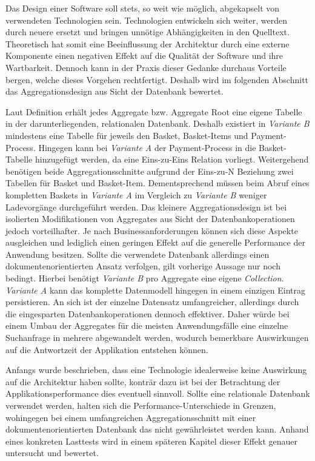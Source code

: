 Das Design einer Software soll stets, so weit wie möglich, abgekapselt von verwendeten Technologien sein. Technologien entwickeln sich weiter, werden durch neuere ersetzt und bringen unnötige Abhängigkeiten in den Quelltext. Theoretisch hat somit eine Beeinflussung der Architektur durch eine externe Komponente einen negativen Effekt auf die Qualität der Software und ihre Wartbarkeit. Dennoch kann in der Praxis dieser Gedanke durchaus Vorteile bergen, welche dieses Vorgehen rechtfertigt. Deshalb wird im folgenden Abschnitt das Aggregationsdesign aus Sicht der Datenbank bewertet.

Laut Definition erhält jedes Aggregate bzw. Aggregate Root eine eigene Tabelle in der darunterliegenden, relationalen Datenbank. Deshalb existiert in \emph{Variante B} mindestens eine Tabelle für jeweils den Basket, Basket-Items und Payment-Process. Hingegen kann bei \emph{Variante A} der Payment-Process in die Basket-Tabelle hinzugefügt werden, da eine Eins-zu-Eins Relation vorliegt. Weitergehend benötigen beide Aggregationsschnitte aufgrund der Eins-zu-N Beziehung zwei Tabellen für Basket und Basket-Item. Dementsprechend müssen beim Abruf eines kompletten Baskets in \emph{Variante A} im Vergleich zu \emph{Variante B} weniger Ladevorgänge durchgeführt werden. Das kleinere Aggregationsdesign ist bei isolierten Modifikationen von Aggregates aus Sicht der Datenbankoperationen jedoch vorteilhafter. Je nach Businessanforderungen können sich diese Aspekte ausgleichen und lediglich einen geringen Effekt auf die generelle Performance der Anwendung besitzen. Sollte die verwendete Datenbank allerdings einen dokumentenorientierten Ansatz verfolgen, gilt vorherige Aussage nur noch bedingt. Hierbei benötigt \emph{Variante B} pro Aggregate eine eigene \emph{\Gls{Collection}}. \emph{Variante A} kann das komplette Datenmodell hingegen in einem einzigen Eintrag persistieren. An sich ist der einzelne Datensatz umfangreicher, allerdings durch die eingesparten Datenbankoperationen dennoch effektiver. Daher würde bei einem Umbau der Aggregates für die meisten Anwendungsfälle eine einzelne Suchanfrage in mehrere abgewandelt werden, wodurch bemerkbare Auswirkungen auf die Antwortzeit der Applikation entstehen können. 

Anfangs wurde beschrieben, dass eine Technologie idealerweise keine Auswirkung auf die Architektur haben sollte, konträr dazu ist bei der Betrachtung der Applikationsperformance dies eventuell sinnvoll. Sollte eine relationale Datenbank verwendet werden, halten sich die Performance-Unterschiede in Grenzen, wohingegen bei einem umfangreichen Aggregationsschnitt mit einer dokumentenorientierten Datenbank das nicht gewährleistet werden kann. Anhand eines konkreten Lasttests wird in einem späteren Kapitel dieser Effekt genauer untersucht und bewertet.

